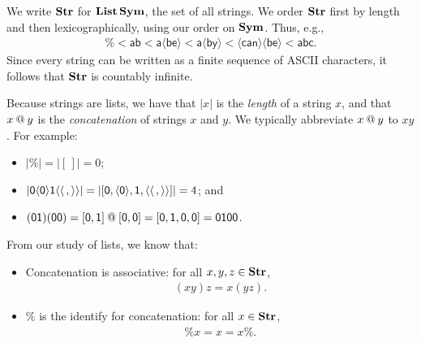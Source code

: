 We write $\mathbf{Str}$ for $\mathbf{List}\,\mathbf{Sym}$, the set of all strings.
%
%
We order
%
$\mathbf{Str}$ first by length and then lexicographically, using our order on
$\mathbf{Sym}$.  Thus, e.g.,
\begin{gather*}
\% < \mathsf{ab} < \mathsf{a\langle be\rangle} < \mathsf{a\langle by\rangle} <
\mathsf{\langle can\rangle\langle be\rangle} < \mathsf{abc} .
\end{gather*}
Since every string can be written as a finite sequence of ASCII
characters, it follows that $\mathbf{Str}$ is countably infinite.
%

Because strings are lists, we have that $|x|$ is the \emph{length}
%
%
%
%
of a string $x$, and that $x\mathbin{@} y$ is the \emph{concatenation}
%
%
of strings $x$ and $y$.
We typically abbreviate $x\mathbin{@} y$ to $xy$.
For example:
\begin{itemize}
\item $|\%| = |[\,]| = 0$;

\item $|\mathsf{0\langle 0\rangle1\langle\langle\,,\rangle\rangle}| =
|[\mathsf{0},\langle\mathsf{0}\rangle,\mathsf{1}, \langle\langle\,,\rangle\rangle]| = 4$;
and

\item $(\mathsf{01})(\mathsf{00}) =
\mathsf{[0,1]}\mathbin{@}\mathsf{[0,0]} =
\mathsf{[0,1,0,0]} = \mathsf{0100}$.
\end{itemize}

From our study of lists, we know that:
\begin{itemize}
\item Concatenation is associative: for all $x,y,z\in\mathbf{Str}$,
%
%
%
\begin{gather*}
(xy)z = x(yz) .
\end{gather*}

\item $\%$ is the identify for concatenation: for all $x\in\mathbf{Str}$,
%
%
%
\begin{gather*}
\%x=x=x\% .
\end{gather*}
\end{itemize}

